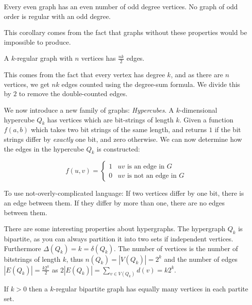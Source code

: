 \begin{corollary}
	Every even graph has an even number of odd degree vertices. No graph of odd order is regular with an odd degree.
\end{corollary}

This corollary comes from the fact that graphs without these properties would be impossible to produce.

\begin{corollary}
	A $k$-regular graph with $n$ vertices has $\frac{nk}{2}$ edges.
\end{corollary}

This comes from the fact that every vertex has degree $k$, and as there are $n$ vertices, we get $nk$ edges counted using the degree-sum formula. We divide this by $2$ to remove the double-counted edges.

We now introduce a new family of graphs: \textit{Hypercubes}. A $k$-dimensional hypercube $Q_{k}$ has vertices which are bit-strings of length $k$. Given a function $f(a,b)$ which takes two bit strings of the same length, and returns $1$ if the bit strings differ by \textit{exactly} one bit, and zero otherwise. We can now determine how the edges in the hypercube $Q_{k}$ is constructed:

\begin{equation}
	f(u,v) = \begin{cases}
		1 & uv \text{ is an edge in } G     \\
		0 & uv \text{ is not an edge in } G
	\end{cases}
\end{equation}

To use not-overly-complicated language: If two vertices differ by one bit, there is an edge between them. If they differ by more than one, there are no edges between them.

There are some interesting properties about hypergraphs. The hypergraph $Q_{k}$ is bipartite, as you can always partition it into two sets if independent vertices. Furthermore $\Delta(Q_{k}) = k = \delta(Q_{k})$. The number of vertices is the number of bitstrings of length $k$, thus $n(Q_{k}) = |V(Q_{k})| = 2^{k}$ and the number of edges $|E(Q_{k})| = \frac{k2^{k}}{2}$ as $2|E(Q_{k})| = \sum_{v \in V(Q_{k})}d(v) = k2^{k}$.

\begin{proposition}
	If $k > 0$ then a $k$-regular bipartite graph has equally many vertices in each partite set.
\end{proposition}

